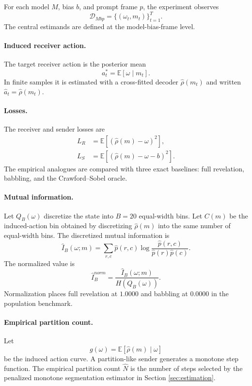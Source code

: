 \documentclass[11pt]{article}
\newcommand{\E}{\mathbb{E}}
\newcommand{\calD}{\mathcal{D}}
\begin{document}
For each model $M$, bias $b$, and prompt frame $p$, the experiment observes
\begin{equation}
    \calD_{Mbp}=\{(\omega_t,m_t)\}_{t=1}^{T}.
\end{equation}
The central estimands are defined at the model-bias-frame level.

\paragraph{Induced receiver action.}
The target receiver action is the posterior mean
\begin{equation}
    a_t^*=\E[\omega\mid m_t].
\end{equation}
In finite samples it is estimated with a cross-fitted decoder $\widehat\rho(m_t)$ and written $\widehat a_t=\widehat\rho(m_t)$.

\paragraph{Losses.}
The receiver and sender losses are
\begin{align}
    L_R &= \E[(\widehat\rho(m)-\omega)^2], \\
    L_S &= \E[(\widehat\rho(m)-\omega-b)^2].
\end{align}
The empirical analogues are compared with three exact baselines: full revelation, babbling, and the Crawford--Sobel oracle.

\paragraph{Mutual information.}
Let $Q_B(\omega)$ discretize the state into $B=20$ equal-width bins.  Let $C(m)$ be the induced-action bin obtained by discretizing $\widehat\rho(m)$ into the same number of equal-width bins.  The discretized mutual information is
\begin{equation}
    \widehat I_B(\omega;m)=\sum_{r,c}\widehat p(r,c)\log\frac{\widehat p(r,c)}{\widehat p(r)\widehat p(c)}.
\end{equation}
The normalized value is
\begin{equation}
    \widehat I^{norm}_B=\frac{\widehat I_B(\omega;m)}{H(Q_B(\omega))}.
\end{equation}
Normalization places full revelation at $1.0000$ and babbling at $0.0000$ in the population benchmark.

\paragraph{Empirical partition count.}
Let
\begin{equation}
    g(\omega)=\E[\widehat\rho(m)\mid \omega]
\end{equation}
be the induced action curve.  A partition-like sender generates a monotone step function.  The empirical partition count $\widehat N$ is the number of steps selected by the penalized monotone segmentation estimator in Section \ref{sec:estimation}.
\end{document}
